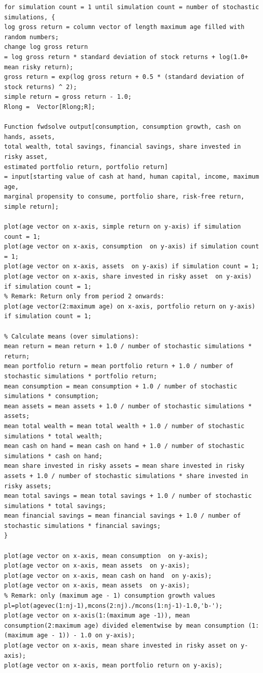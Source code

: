 \documentclass[a4paper,9pt, parskip=half-]{scrartcl}
\begin{document}
\begin{lstlisting}[frame=single]
for simulation count = 1 until simulation count = number of stochastic simulations, {
log gross return = column vector of length maximum age filled with random numbers;
change log gross return 
= log gross return * standard deviation of stock returns + log(1.0+ mean risky return);
gross return = exp(log gross return + 0.5 * (standard deviation of stock returns) ^ 2);
simple return = gross return - 1.0;
Rlong =  Vector[Rlong;R];

Function fwdsolve output[consumption, consumption growth, cash on hands, assets, 
total wealth, total savings, financial savings, share invested in risky asset, 
estimated portfolio return, portfolio return]
= input[starting value of cash at hand, human capital, income, maximum age, 
marginal propensity to consume, portfolio share, risk-free return, simple return];

plot(age vector on x-axis, simple return on y-axis) if simulation count = 1;
plot(age vector on x-axis, consumption  on y-axis) if simulation count = 1;
plot(age vector on x-axis, assets  on y-axis) if simulation count = 1;
plot(age vector on x-axis, share invested in risky asset  on y-axis) if simulation count = 1;
% Remark: Return only from period 2 onwards:
plot(age vector(2:maximum age) on x-axis, portfolio return on y-axis) if simulation count = 1; 
    
% Calculate means (over simulations):
mean return = mean return + 1.0 / number of stochastic simulations * return;
mean portfolio return = mean portfolio return + 1.0 / number of stochastic simulations * portfolio return;
mean consumption = mean consumption + 1.0 / number of stochastic simulations * consumption;
mean assets = mean assets + 1.0 / number of stochastic simulations * assets;
mean total wealth = mean total wealth + 1.0 / number of stochastic simulations * total wealth;
mean cash on hand = mean cash on hand + 1.0 / number of stochastic simulations * cash on hand;
mean share invested in risky assets = mean share invested in risky assets + 1.0 / number of stochastic simulations * share invested in risky assets;
mean total savings = mean total savings + 1.0 / number of stochastic simulations * total savings;
mean financial savings = mean financial savings + 1.0 / number of stochastic simulations * financial savings;
}

plot(age vector on x-axis, mean consumption  on y-axis);
plot(age vector on x-axis, mean assets  on y-axis);
plot(age vector on x-axis, mean cash on hand  on y-axis);
plot(age vector on x-axis, mean assets  on y-axis);
% Remark: only (maximum age - 1) consumption growth values
pl=plot(agevec(1:nj-1),mcons(2:nj)./mcons(1:nj-1)-1.0,'b-');
plot(age vector on x-axis(1:(maximum age -1)), mean consumption(2:maximum age) divided elementwise by mean consumption (1:(maximum age - 1)) - 1.0 on y-axis);
plot(age vector on x-axis, mean share invested in risky asset on y-axis);
plot(age vector on x-axis, mean portfolio return on y-axis);


\end{lstlisting}
\end{document}
